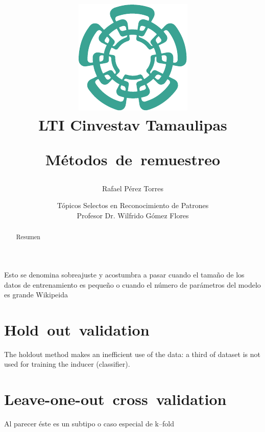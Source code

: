 \documentclass{article}
\begin{document}
\title{
	\begin{figure}[!ht]
	\centering
		\includegraphics[scale=0.8]{resources/images/cinvestav-logo}
		\\[0.5cm]LTI Cinvestav Tamaulipas
	\end{figure}
	\vspace{1cm}
	Métodos de remuestreo
	\vspace{1cm}
}
	
\author{Rafael Pérez Torres}	
		
\date{
	Tópicos Selectos en Reconocimiento de Patrones \\ 
	\vspace{0.8cm}
	Profesor Dr. Wilfrido Gómez Flores \\
	\vspace{1cm}
}

\maketitle

\begin{abstract}
Resumen
\end{abstract}

Esto se denomina sobreajuste y acostumbra a pasar cuando el tamaño de los datos de entrenamiento es pequeño o cuando el número de parámetros del modelo es grande
Wikipeida
\section{Hold out validation}
The holdout method makes an inefficient use of the data: a third of dataset is not used for training the inducer (classifier).

\section{Leave-­one-­out cross validation}
Al parecer éste es un subtipo o caso especial de k--fold
\end{document}

